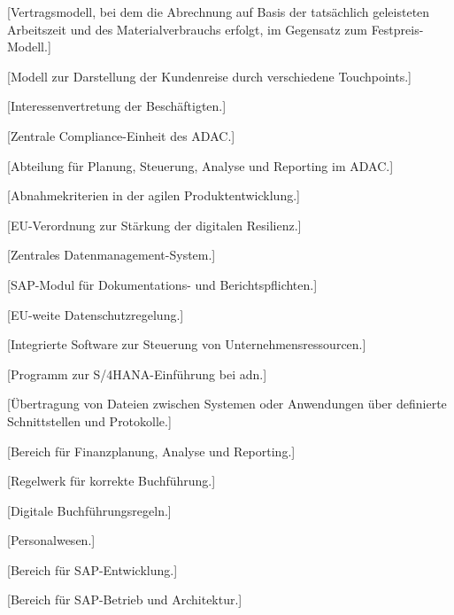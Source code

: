 [Vertragsmodell, bei dem die Abrechnung auf Basis der tatsächlich geleisteten Arbeitszeit und des Materialverbrauchs erfolgt, im Gegensatz zum Festpreis-Modell.]

[Modell zur Darstellung der Kundenreise durch verschiedene Touchpoints.]

[Interessenvertretung der Beschäftigten.]

[Zentrale Compliance-Einheit des ADAC.]

[Abteilung für Planung, Steuerung, Analyse und Reporting im ADAC.]

[Abnahmekriterien in der agilen Produktentwicklung.]

[EU-Verordnung zur Stärkung der digitalen Resilienz.]

[Zentrales Datenmanagement-System.]

[SAP-Modul für Dokumentations- und Berichtspflichten.]

[EU-weite Datenschutzregelung.]

[Integrierte Software zur Steuerung von Unternehmensressourcen.]

[Programm zur S/4HANA-Einführung bei \gls{adn}.]

[Übertragung von Dateien zwischen Systemen oder Anwendungen über definierte Schnittstellen und Protokolle.]

[Bereich für Finanzplanung, Analyse und Reporting.]

[Regelwerk für korrekte Buchführung.]

[Digitale Buchführungsregeln.]

[Personalwesen.]

[Bereich für SAP-Entwicklung.]

[Bereich für SAP-Betrieb und Architektur.]

